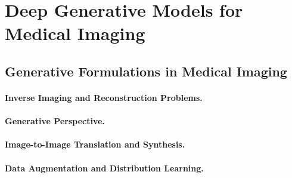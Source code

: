 \section{Deep Generative Models for Medical Imaging}
\label{sec:medical_imaging_context}

\subsection{Generative Formulations in Medical Imaging}

\paragraph{Inverse Imaging and Reconstruction Problems.}

\paragraph{Generative Perspective.}

\paragraph{Image-to-Image Translation and Synthesis.}

\paragraph{Data Augmentation and Distribution Learning.}


